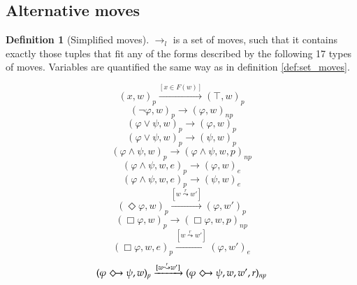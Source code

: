 \documentclass[a4paper,american]{paper}
\theoremstyle{definition}\newtheorem{definition}{Definition}
\begin{document}
\subsection{Alternative moves}
\begin{definition}[Simplified moves]
$\rightarrow_l$ is a set of moves, such that it contains exactly those tuples that fit any of the forms described by the following 17 types of moves. Variables are quantified the same way as in definition \ref{def:set_moves}.
\begin{figure}[H]
	\centering
	\begin{equation}
		(x ,w)_{p}\xrightarrow{[x\in F(w)]} (\top ,w)_{p}
	\end{equation}
	\begin{equation}
		(\neg\varphi ,w)_{p}\rightarrow (\varphi ,w)_{np}
	\end{equation}
	\begin{equation}
		(\varphi\vee\psi ,w)_{p}\rightarrow (\varphi ,w)_{p}
	\end{equation}
	\begin{equation}
		(\varphi\vee\psi ,w)_{p}\rightarrow (\psi ,w)_{p}
	\end{equation}
	\begin{equation}
		(\varphi\wedge\psi ,w)_{p}\rightarrow (\varphi\wedge\psi ,w,p)_{np}
	\end{equation}
	\begin{equation}
		(\varphi\wedge\psi ,w,e)_{p}\rightarrow (\varphi ,w)_{e}
	\end{equation}
	\begin{equation}
		(\varphi\wedge\psi ,w,e)_{p}\rightarrow (\psi ,w)_{e}
	\end{equation}
	\begin{equation}
		(\Diamond\varphi ,w)_{p}\xrightarrow{[w\overset{r}{\leadsto}w']} (\varphi ,w')_{p}
	\end{equation}
	\begin{equation}
		(\Box\varphi ,w)_{p}\rightarrow (\Box\varphi ,w,p)_{np}
	\end{equation}
	\begin{equation}
		(\Box\varphi ,w,e)_{p}\xrightarrow{[w\overset{r}{\leadsto}w']} (\varphi ,w')_{e}
	\end{equation}
	\begin{equation}
		(\varphi\Diamondright\psi ,w)_{p}\xrightarrow{[w\overset{r}{\leadsto}w']} (\varphi\Diamondright\psi ,w,w',r)_{np}
	\end{equation}
	\begin{equation}

\end{equation}
\end{figure}
\end{definition}
\end{document}
